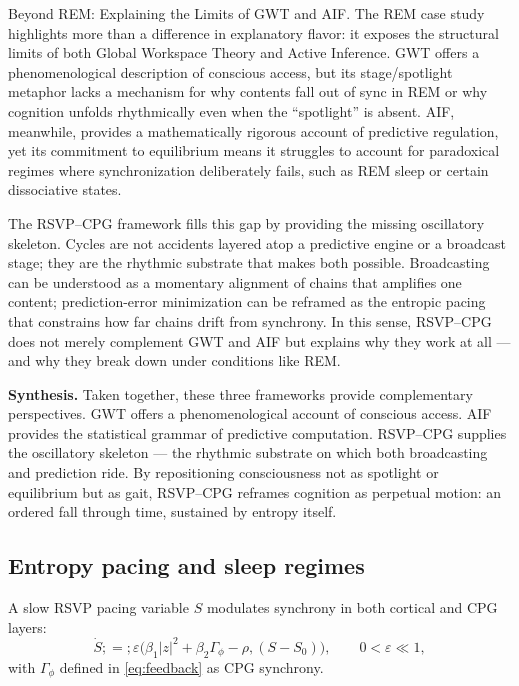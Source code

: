 \documentclass{article}
\begin{document}
Beyond REM: Explaining the Limits of GWT and AIF. The REM case study highlights more than a difference in explanatory flavor: it exposes the structural limits of both Global Workspace Theory and Active Inference. GWT offers a phenomenological description of conscious access, but its stage/spotlight metaphor lacks a mechanism for why contents fall out of sync in REM or why cognition unfolds rhythmically even when the “spotlight” is absent. AIF, meanwhile, provides a mathematically rigorous account of predictive regulation, yet its commitment to equilibrium means it struggles to account for paradoxical regimes where synchronization deliberately fails, such as REM sleep or certain dissociative states.



The RSVP--CPG framework fills this gap by providing the missing oscillatory skeleton. Cycles are not accidents layered atop a predictive engine or a broadcast stage; they are the rhythmic substrate that makes both possible. Broadcasting can be understood as a momentary alignment of chains that amplifies one content; prediction-error minimization can be reframed as the entropic pacing that constrains how far chains drift from synchrony. In this sense, RSVP--CPG does not merely complement GWT and AIF but explains why they work at all — and why they break down under conditions like REM.

\textbf{Synthesis.} Taken together, these three frameworks provide complementary perspectives. GWT offers a phenomenological account of conscious access. AIF provides the statistical grammar of predictive computation. RSVP--CPG supplies the oscillatory skeleton — the rhythmic substrate on which both broadcasting and prediction ride. By repositioning consciousness not as spotlight or equilibrium but as gait, RSVP--CPG reframes cognition as perpetual motion: an ordered fall through time, sustained by entropy itself.


\subsection{Entropy pacing and sleep regimes}

A slow RSVP pacing variable $S$ modulates synchrony in both cortical and CPG layers:
\begin{equation}
\dot S ;=; \varepsilon\Big(\beta_1 |z|^2 + \beta_2 \Gamma_\phi - \rho,(S-S_0)\Big),
\qquad 0<\varepsilon\ll1,
\label{eq:S}
\end{equation}
with $\Gamma_\phi$ defined in \eqref{eq:feedback} as CPG synchrony.
\end{document}
